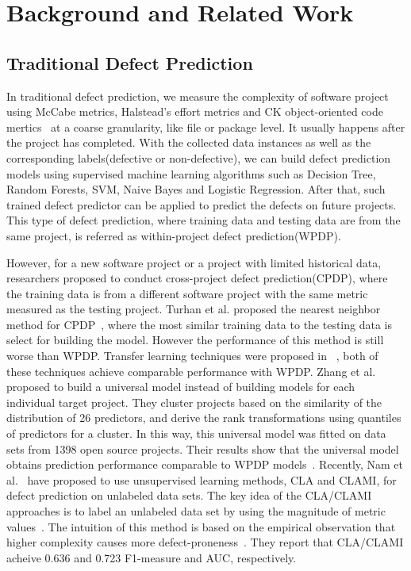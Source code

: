 \section{Background and Related Work}

\subsection{Traditional Defect Prediction}
In traditional defect prediction, we measure the complexity of
software project using McCabe metrics, Halstead's effort metrics and  CK object-oriented code mertics~\cite{kafura1987use,chidamber1994metrics,mccabe1976complexity,halstead1977elements} at
a coarse granularity, like file or package level. It usually happens after the project has completed. With the collected data instances as well as the corresponding labels(defective or non-defective), we can  build defect prediction models using supervised machine learning algorithms such as Decision Tree, Random Forests, SVM, Naive Bayes and Logistic Regression\cite{khoshgoftaar2001modeling,khoshgoftaar2003software,khoshgoftaar2000balancing,menzies2007data,lessmann2008benchmarking,hall2012systematic}. After that, such trained defect predictor can be applied
to predict the defects on future projects. This type of defect prediction, where training data and testing data are from the same project, is referred as within-project defect prediction(WPDP).

However, for a new software project or a project with limited historical data, researchers
proposed to conduct cross-project defect prediction(CPDP), where the training data is from a different software project with the same metric measured as the testing project. Turhan et al. proposed the nearest neighbor method for CPDP~\cite{turhan2009relative}, where the most similar
training data to the testing data is select for building the model. However the performance of this method is still worse than WPDP. Transfer learning  techniques were proposed  in ~\cite{nam2013transfer, ma2012transfer}, both of these techniques achieve comparable performance with WPDP. Zhang et al.~\cite{zhang2014towards} proposed to build a universal model instead of building models
for each individual target project. They cluster projects based on the similarity of the distribution of 26 predictors, and derive the rank transformations using quantiles of predictors for a cluster. In this way, this universal model was fitted on data sets from 1398 open source projects. Their results show that the universal model obtains prediction performance comparable to WPDP models~\cite{zhang2014towards}. Recently, Nam et al.~\cite{nam2015clami} have proposed
to use unsupervised learning methods, CLA and CLAMI, for defect prediction  on unlabeled data sets. The key idea of
the CLA/CLAMI approaches is to label an unlabeled data set by using the magnitude of metric values~\cite{nam2015clami}. The intuition of this method is based on the empirical observation that higher complexity causes more defect-proneness~\cite{menzies2007data,rahman2013and}. They report that CLA/CLAMI acheive 0.636 and 0.723 F1-measure and AUC, respectively. 

